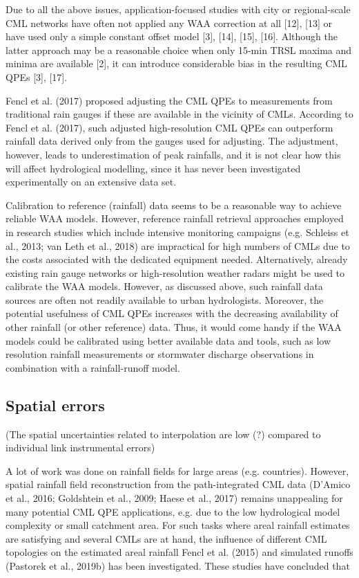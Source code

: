 \documentclass{ctuthesis}\usepackage[]{graphicx}\usepackage[]{color}
\begin{document}
Due to all the above issues, application-focused studies with city or regional-scale CML networks have often not applied any WAA correction at all [12], [13] or have used only a simple constant offset model [3], [14], [15], [16]. Although the latter approach may be a reasonable choice when only 15-min TRSL maxima and minima are available [2], it can introduce considerable bias in the resulting CML QPEs [3], [17].

Fencl et al. (2017) proposed adjusting the CML QPEs to measurements from traditional rain gauges if these are available in the vicinity of CMLs. According to Fencl et al. (2017), such adjusted high-resolution CML QPEs can outperform rainfall data derived only from the gauges used for adjusting. The adjustment, however, leads to underestimation of peak rainfalls, and it is not clear how this will affect hydrological modelling, since it has never been investigated experimentally on an extensive data set.


Calibration to reference (rainfall) data seems to be a reasonable way to achieve reliable WAA models. However, reference rainfall retrieval approaches employed in research studies which include intensive monitoring campaigns (e.g. Schleiss et al., 2013; van Leth et al., 2018) are impractical for high numbers of CMLs due to the costs associated with the dedicated equipment needed. Alternatively, already existing rain gauge networks or high-resolution weather radars might be used to calibrate the WAA models. However, as discussed above, such rainfall data sources are often not readily available to urban hydrologists. Moreover, the potential usefulness of CML QPEs increases with the decreasing availability of other rainfall (or other reference) data. Thus, it would come handy if the WAA models could be calibrated using better available data and tools, such as low resolution rainfall measurements or stormwater discharge observations in combination with a rainfall-runoff model.



\subsection{Spatial errors}
(The spatial uncertainties related to interpolation are low (?) compared to individual link instrumental errors)

A lot of work was done on rainfall fields for large areas (e.g. countries). However, spatial rainfall field reconstruction from the path-integrated CML data (D’Amico et al., 2016; Goldshtein et al., 2009; Haese et al., 2017) remains unappealing for many potential CML QPE applications, e.g. due to the low hydrological model complexity or small catchment area. For such tasks where areal rainfall estimates are satisfying and several CMLs are at hand, the influence of different CML topologies on the estimated areal rainfall Fencl et al. (2015) and simulated runoffs (Pastorek et al., 2019b) has been investigated. These studies have concluded that
\end{document}
